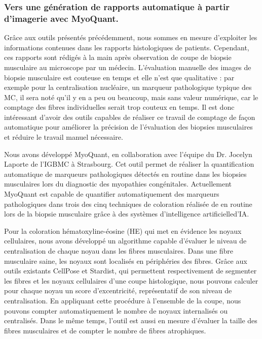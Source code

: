 \subsubsection{Vers une génération de rapports automatique à partir d’imagerie avec MyoQuant.}

Grâce aux outils présentés précédemment, nous sommes en mesure d’exploiter les informations contenues dans les rapports histologiques de patients. Cependant, ces rapports sont rédigés à la main après observation de coupe de biopsie musculaire au microscope par un médecin. L’évaluation manuelle des images de biopsie musculaire est couteuse en temps et elle n’est que qualitative : par exemple pour la centralisation nucléaire, un marqueur pathologique typique des MC, il sera noté qu’il y en a peu ou beaucoup, mais sans valeur numérique, car le comptage des fibres individuelles serait trop couteux en temps. Il est donc intéressant d’avoir des outils capables de réaliser ce travail de comptage de façon automatique pour améliorer la précision de l’évaluation des biopsies musculaires et réduire le travail manuel nécessaire.

Nous avons développé MyoQuant, en collaboration avec l’équipe du Dr. Jocelyn Laporte de l’IGBMC à Strasbourg. Cet outil permet de réaliser la quantification automatique de marqueurs pathologiques détectés en routine dans les biopsies musculaires lors du diagnostic des myopathies congénitales. Actuellement MyoQuant est capable de quantifier automatiquement des marqueurs pathologiques dans trois des cinq techniques de coloration réalisée de en routine lors de la biopsie musculaire grâce à des systèmes d’intelligence artificielled’IA.

Pour la coloration hématoxyline-éosine (HE) qui met en évidence les noyaux cellulaires, nous avons développé un algorithme capable d’évaluer le niveau de centralisation de chaque noyau dans les fibres musculaires. Dans une fibre musculaire saine, les noyaux sont localisés en périphéries des fibres. Grâce aux outils existants CellPose et Stardist, qui permettent respectivement de segmenter les fibres et les noyaux cellulaires d’une coupe histologique, nous pouvons calculer pour chaque noyau un score d’excentricité, représentatif de son niveau de centralisation. En appliquant cette procédure à l’ensemble de la coupe, nous pouvons compter automatiquement le nombre de noyaux internalisés ou centralisés. Dans le même temps, l’outil est aussi en mesure d’évaluer la taille des fibres musculaires et de compter le nombre de fibres atrophiques.

